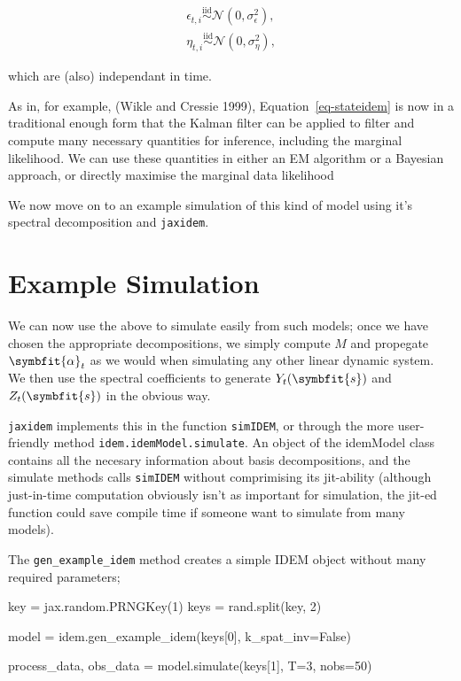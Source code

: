 \documentclass[
]{report}
\newenvironment{Shaded}{\begin{snugshade}}{\end{snugshade}}
\newcommand{\DecValTok}[1]{\textcolor[rgb]{0.68,0.00,0.00}{#1}}
\newcommand{\NormalTok}[1]{\textcolor[rgb]{0.00,0.23,0.31}{#1}}
\newcommand{\OperatorTok}[1]{\textcolor[rgb]{0.37,0.37,0.37}{#1}}
\newcommand{\VariableTok}[1]{\textcolor[rgb]{0.07,0.07,0.07}{#1}}
\newcommand{\bv}[1]{\symbfit{#1}}
\theoremstyle{plain}
\theoremstyle{plain}
\theoremstyle{plain}
\theoremstyle{remark}
\begin{document}
\[\begin{split}
\epsilon_{t,i} \overset{\mathrm{iid}}{\sim} \mathcal N(0,\sigma^2_\epsilon),\\
\eta_{t,i} \overset{\mathrm{iid}}{\sim} \mathcal N(0,\sigma^2_\eta),
\end{split}
\]

which are (also) independant in time.

As in, for example, (Wikle and Cressie 1999),
Equation~\ref{eq-stateidem} is now in a traditional enough form that the
Kalman filter can be applied to filter and compute many necessary
quantities for inference, including the marginal likelihood. We can use
these quantities in either an EM algorithm or a Bayesian approach, or
directly maximise the marginal data likelihood

We now move on to an example simulation of this kind of model using it's
spectral decomposition and \texttt{jaxidem}.

\section{Example Simulation}\label{example-simulation}

We can now use the above to simulate easily from such models; once we
have chosen the appropriate decompositions, we simply compute \(M\) and
propegate \(\bv \alpha_t\) as we would when simulating any other linear
dynamic system. We then use the spectral coefficients to generate
\(Y_t(\bv s)\) and \(Z_t(\bv s)\) in the obvious way.

\texttt{jaxidem} implements this in the function \texttt{simIDEM}, or
through the more user-friendly method \texttt{idem.idemModel.simulate}.
An object of the idemModel class contains all the necesary information
about basis decompositions, and the simulate methods calls
\texttt{simIDEM} without comprimising its jit-ability (although
just-in-time computation obviously isn't as important for simulation,
the jit-ed function could save compile time if someone want to simulate
from many models).

The \texttt{gen\_example\_idem} method creates a simple IDEM object
without many required parameters;

\begin{Shaded}
\begin{Highlighting}[]
\NormalTok{key }\OperatorTok{=}\NormalTok{ jax.random.PRNGKey(}\DecValTok{1}\NormalTok{)}
\NormalTok{keys }\OperatorTok{=}\NormalTok{ rand.split(key, }\DecValTok{2}\NormalTok{)}

\NormalTok{model }\OperatorTok{=}\NormalTok{ idem.gen\_example\_idem(keys[}\DecValTok{0}\NormalTok{], k\_spat\_inv}\OperatorTok{=}\VariableTok{False}\NormalTok{)}

\NormalTok{process\_data, obs\_data }\OperatorTok{=}\NormalTok{ model.simulate(keys[}\DecValTok{1}\NormalTok{], T}\OperatorTok{=}\DecValTok{3}\NormalTok{, nobs}\OperatorTok{=}\DecValTok{50}\NormalTok{)}
\end{Highlighting}
\end{Shaded}
\end{document}
